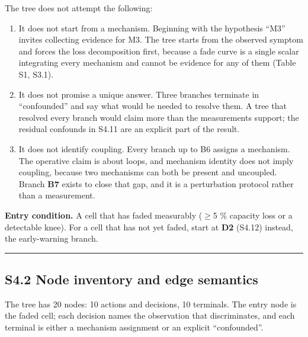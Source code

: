 \documentclass[11pt,a4paper]{article}
\begin{document}
The tree does not attempt the following:


\begin{enumerate}
  \item It does not start from a mechanism. Beginning with the hypothesis \textquotedblleft{}M3\textquotedblright{} invites collecting evidence for M3. The tree starts from the observed symptom and forces the loss decomposition first, because a fade curve is a single scalar integrating every mechanism and cannot be evidence for any of them (Table S1, S3.1).
  \item It does not promise a unique answer. Three branches terminate in \textquotedblleft{}confounded\textquotedblright{} and say what would be needed to resolve them. A tree that resolved every branch would claim more than the measurements support; the residual confounds in S4.11 are an explicit part of the result.
  \item It does not identify coupling. Every branch up to B6 assigns a mechanism. The operative claim is about loops, and mechanism identity does not imply coupling, because two mechanisms can both be present and uncoupled. Branch \textbf{B7} exists to close that gap, and it is a perturbation protocol rather than a measurement.
\end{enumerate}


\textbf{Entry condition.} A cell that has faded measurably (\ensuremath{\geq}5 \% capacity loss or a detectable knee). For a cell that has not yet faded, start at \textbf{D2} (S4.12) instead, the early-warning branch.


\par\noindent\rule{\linewidth}{0.4pt}\par


\subsection*{S4.2 Node inventory and edge semantics}


The tree has 20 nodes: 10 actions and decisions, 10 terminals. The entry node is the faded cell; each decision names the observation that discriminates, and each terminal is either a mechanism assignment or an explicit \textquotedblleft{}confounded\textquotedblright{}.
\end{document}
